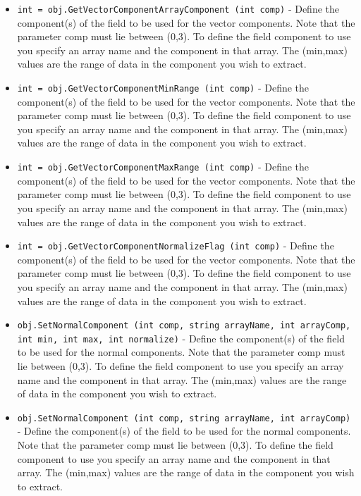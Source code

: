 \begin{itemize}
\item  \verb|int = obj.GetVectorComponentArrayComponent (int comp)| -  Define the component(s) of the field to be used for the vector
 components.  Note that the parameter comp must lie between (0,3). To
 define the field component to use you specify an array name and the
 component in that array. The (min,max) values are the range of data in
 the component you wish to extract.

\item  \verb|int = obj.GetVectorComponentMinRange (int comp)| -  Define the component(s) of the field to be used for the vector
 components.  Note that the parameter comp must lie between (0,3). To
 define the field component to use you specify an array name and the
 component in that array. The (min,max) values are the range of data in
 the component you wish to extract.

\item  \verb|int = obj.GetVectorComponentMaxRange (int comp)| -  Define the component(s) of the field to be used for the vector
 components.  Note that the parameter comp must lie between (0,3). To
 define the field component to use you specify an array name and the
 component in that array. The (min,max) values are the range of data in
 the component you wish to extract.

\item  \verb|int = obj.GetVectorComponentNormalizeFlag (int comp)| -  Define the component(s) of the field to be used for the vector
 components.  Note that the parameter comp must lie between (0,3). To
 define the field component to use you specify an array name and the
 component in that array. The (min,max) values are the range of data in
 the component you wish to extract.

\item  \verb|obj.SetNormalComponent (int comp, string arrayName, int arrayComp, int min, int max, int normalize)| -  Define the component(s) of the field to be used for the normal
 components.  Note that the parameter comp must lie between (0,3). To
 define the field component to use you specify an array name and the
 component in that array. The (min,max) values are the range of data in
 the component you wish to extract.

\item  \verb|obj.SetNormalComponent (int comp, string arrayName, int arrayComp)| -  Define the component(s) of the field to be used for the normal
 components.  Note that the parameter comp must lie between (0,3). To
 define the field component to use you specify an array name and the
 component in that array. The (min,max) values are the range of data in
 the component you wish to extract.


\end{itemize}
